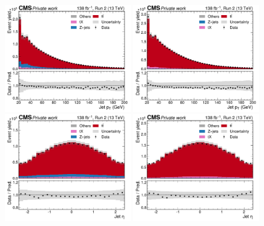 \begin{figure}[!hp]
    \centering
    \includegraphics[width=0.49\textwidth]{figures/ah/controlplots/ReqMET/sf/jet_pt_ReqMET_sf.pdf}
    \hfill
    \includegraphics[width=0.49\textwidth]{figures/ah/controlplots/ReqMET/em/jet_pt_ReqMET_em.pdf}
    \includegraphics[width=0.49\textwidth]{figures/ah/controlplots/ReqMET/sf/jet_eta_ReqMET_sf.pdf}
    \hfill
    \includegraphics[width=0.49\textwidth]{figures/ah/controlplots/ReqMET/em/jet_eta_ReqMET_em.pdf}

\end{figure}
